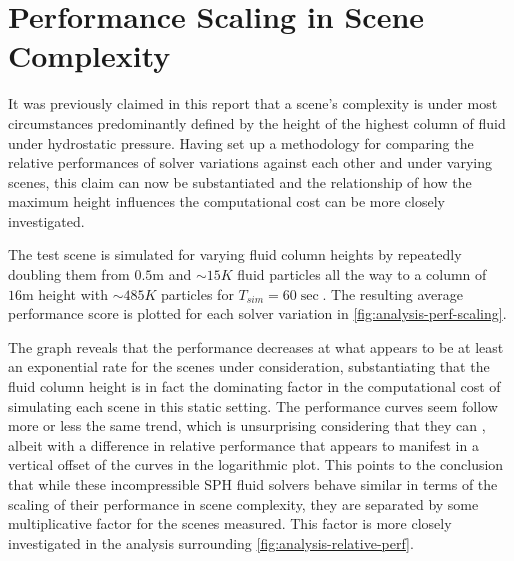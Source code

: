 \documentclass[oneside, a4paper]{book}
\begin{document}

  \section{Performance Scaling in Scene Complexity}
  It was previously claimed in this report that a scene's complexity is under most circumstances predominantly defined by the height of the highest column of fluid under hydrostatic pressure. Having set up a methodology for comparing the relative performances of solver variations against each other and under varying scenes, this claim can now be substantiated and the relationship of how the maximum height influences the computational cost can be more closely investigated.

  The test scene is simulated for varying fluid column heights by repeatedly doubling them from $0.5\text{m}$ and $\sim15K$ fluid particles all the way to a column of $16\text{m}$ height with $\sim485K$ particles for $T_{sim}=60\sec$. The resulting average performance score is plotted for each solver variation in \autoref{fig:analysis-perf-scaling}. 

  

  The graph reveals that the performance decreases at what appears to be at least an exponential rate for the scenes under consideration, substantiating that the fluid column height is in fact the dominating factor in the computational cost of simulating each scene in this static setting. The performance curves seem follow more or less the same trend, which is unsurprising considering that they can \autocite[all be shown to be functionally equivalent to some degree]{2022-survey-equographics-star}, albeit with a difference in relative performance that appears to manifest in a vertical offset of the curves in the logarithmic plot. This points to the conclusion that while these incompressible SPH fluid solvers behave similar in terms of the scaling of their performance in scene complexity, they are separated by some multiplicative factor for the scenes measured. This factor is more closely investigated in the analysis surrounding \autoref{fig:analysis-relative-perf}. 
  
\end{document}
